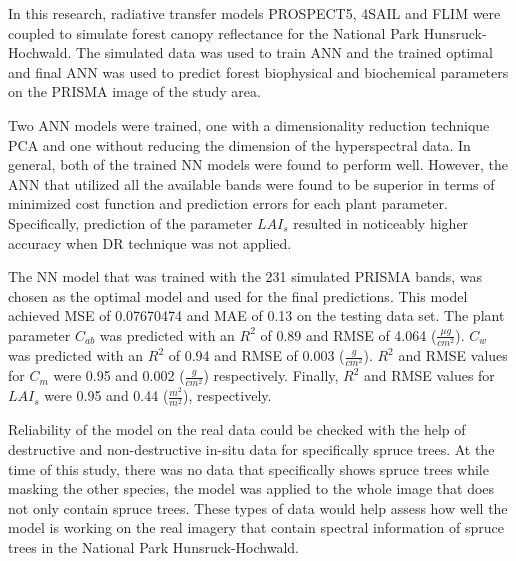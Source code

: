 \documentclass[a4paper, twoside]{templates/ociamthesis}
\begin{document}
In this research, radiative transfer models PROSPECT5, 4SAIL and FLIM were coupled to simulate forest canopy reflectance for the National Park Hunsruck-Hochwald. The simulated data was used to train ANN and the trained optimal and final ANN was used to predict forest biophysical and biochemical parameters on the PRISMA image of the study area.

Two ANN models were trained, one with a dimensionality reduction technique PCA and one without reducing the dimension of the hyperspectral data. In general, both of the trained NN models were found to perform well. However, the ANN that utilized all the available bands were found to be superior in terms of minimized cost function and prediction errors for each plant parameter. Specifically, prediction of the parameter \(LAI_{s}\) resulted in noticeably higher accuracy when DR technique was not applied.

The NN model that was trained with the 231 simulated PRISMA bands, was chosen as the optimal model and used for the final predictions. This model achieved MSE of 0.07670474 and MAE of 0.13 on the testing data set. The plant parameter \(C_{ab}\) was predicted with an \(R^2\) of 0.89 and RMSE of 4.064 (\(\frac{\mu g}{cm^2}\)). \(C_{w}\) was predicted with an \(R^2\) of 0.94 and RMSE of 0.003 (\(\frac{g}{cm^2}\)). \(R^2\) and RMSE values for \(C_{m}\) were 0.95 and 0.002 (\(\frac{g}{cm^2}\)) respectively. Finally, \(R^2\) and RMSE values for \(LAI_{s}\) were 0.95 and 0.44 (\(\frac{m^2}{m^2}\)), respectively.

Reliability of the model on the real data could be checked with the help of destructive and non-destructive in-situ data for specifically spruce trees. At the time of this study, there was no data that specifically shows spruce trees while masking the other species, the model was applied to the whole image that does not only contain spruce trees. These types of data would help assess how well the model is working on the real imagery that contain spectral information of spruce trees in the National Park Hunsruck-Hochwald.






\end{document}
